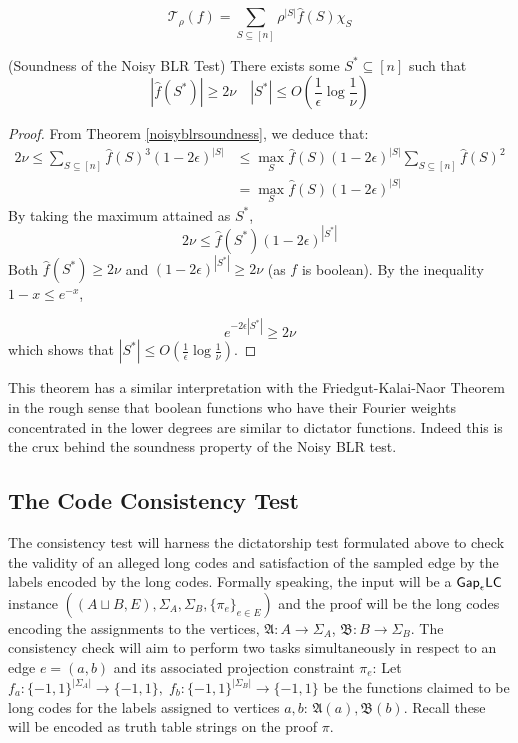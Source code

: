 \begin{equation}
  \mathcal{T}_\rho(f) = \sum_{S \subseteq [n]} \rho^{|S|}\widehat{f}(S)\chi_S
\end{equation}

%
\begin{corollary}
  (Soundness of the Noisy BLR Test) There exists some $S^* \subseteq [n]$ such that
  \begin{equation}
    |\widehat{f}(S^*)| \geq 2\nu \quad |S^*| \leq O\left(\frac{1}{\epsilon}\log{\frac{1}{\nu}}\right)
  \end{equation}
\end{corollary}
%
\begin{proof}
  From Theorem \ref{noisyblrsoundness}, we deduce that:
  \begin{align*}
      2\nu \leq  \sum_{S \subseteq [n]} \widehat{f}(S)^3 (1-2\epsilon)^{|S|} & \leq \max_{S}{\widehat{f}(S)}(1-2\epsilon)^{|S|} \sum_{S \subseteq [n]} \widehat{f}(S)^2 \\
      & = \max_{S}{\widehat{f}(S)}(1-2\epsilon)^{|S|}
  \end{align*}
  By taking the maximum attained as $S^*$,
  \[2\nu \leq \widehat{f}(S^*)(1-2\epsilon)^{|S^*|} \]
  Both $\widehat{f}(S^*) \geq 2\nu$ and $(1-2\epsilon)^{|S^*|} \geq 2\nu$ (as $f$ is boolean). By the inequality $1 - x \leq e^{-x}$,

  \[e^{-2\epsilon|S^*|} \geq 2\nu \]
  which shows that $|S^*| \leq O\left(\frac{1}{\epsilon}\log{\frac{1}{\nu}}\right)$.
\end{proof}
%
\begin{remark}
  This theorem has a similar interpretation with the Friedgut-Kalai-Naor Theorem in the rough sense that boolean functions who have their Fourier weights concentrated in the lower degrees are similar to dictator functions. Indeed this is the crux behind the soundness property of the Noisy BLR test.
\end{remark}

\subsection{The Code Consistency Test}
The consistency test will harness the dictatorship test formulated above to check the validity of an alleged long codes and satisfaction of the sampled edge by the labels encoded by the long codes. Formally speaking, the input will be a $\mathsf{Gap}_\epsilon\mathsf{LC}$ instance $((A\sqcup B,E),\Sigma_A,\Sigma_B,\{\pi_e\}_{e \in E})$ and the proof will be the long codes encoding the assignments to the vertices, $\mathfrak{A}: A \rightarrow \Sigma_A$, $\mathfrak{B}: B \rightarrow \Sigma_B$. The consistency check will aim to perform two tasks simultaneously in respect to an edge $e = (a,b)$ and its associated projection constraint $\pi_e$: Let $f_a:\{-1,1\}^{|\Sigma_A|} \rightarrow \{-1,1\}, \; f_b:\{-1,1\}^{|\Sigma_B|} \rightarrow \{-1,1\}$ be the functions claimed to be long codes for the labels assigned to vertices $a,b$: $\mathfrak{A}(a),\mathfrak{B}(b)$. Recall these will be encoded as truth table strings on the proof $\pi$.

